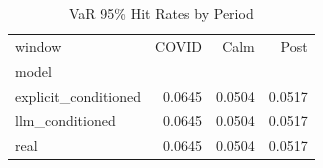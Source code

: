 \begin{table}
\caption{VaR 95\% Hit Rates by Period}
\label{tab:hit_rates_95}
\begin{tabular}{lrrr}
\toprule
window & COVID & Calm & Post \\
model &  &  &  \\
\midrule
explicit_conditioned & 0.0645 & 0.0504 & 0.0517 \\
llm_conditioned & 0.0645 & 0.0504 & 0.0517 \\
real & 0.0645 & 0.0504 & 0.0517 \\
\bottomrule
\end{tabular}
\end{table}
